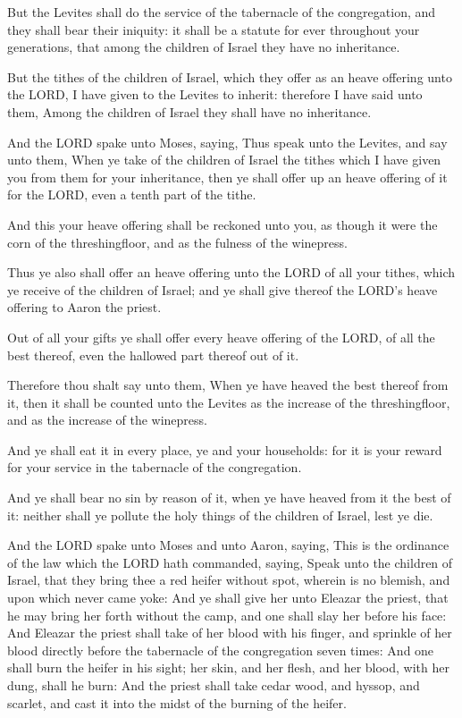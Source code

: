 \Verse But the Levites shall do the service of the tabernacle of the
congregation, and they shall bear their iniquity: it shall be a
statute for ever throughout your generations, that among the children
of Israel they have no inheritance.

\Verse But the tithes of the children of Israel, which they offer as an
heave offering unto the LORD, I have given to the Levites to inherit:
therefore I have said unto them, Among the children of Israel they
shall have no inheritance.

\Verse And the LORD spake unto Moses, saying, \Verse Thus speak unto the
Levites, and say unto them, When ye take of the children of Israel the
tithes which I have given you from them for your inheritance, then ye
shall offer up an heave offering of it for the LORD, even a tenth part
of the tithe.

\Verse And this your heave offering shall be reckoned unto you, as
though it were the corn of the threshingfloor, and as the fulness of
the winepress.

\Verse Thus ye also shall offer an heave offering unto the LORD of all
your tithes, which ye receive of the children of Israel; and ye shall
give thereof the LORD's heave offering to Aaron the priest.

\Verse Out of all your gifts ye shall offer every heave offering of the
LORD, of all the best thereof, even the hallowed part thereof out of
it.

\Verse Therefore thou shalt say unto them, When ye have heaved the best
thereof from it, then it shall be counted unto the Levites as the
increase of the threshingfloor, and as the increase of the winepress.

\Verse And ye shall eat it in every place, ye and your households: for
it is your reward for your service in the tabernacle of the
congregation.

\Verse And ye shall bear no sin by reason of it, when ye have heaved
from it the best of it: neither shall ye pollute the holy things of
the children of Israel, lest ye die.


\Chapter
\Verse And the LORD spake unto Moses and unto Aaron, saying, \Verse This
is the ordinance of the law which the LORD hath commanded, saying,
Speak unto the children of Israel, that they bring thee a red heifer
without spot, wherein is no blemish, and upon which never came yoke:
\Verse And ye shall give her unto Eleazar the priest, that he may bring
her forth without the camp, and one shall slay her before his face:
\Verse And Eleazar the priest shall take of her blood with his finger,
and sprinkle of her blood directly before the tabernacle of the
congregation seven times: \Verse And one shall burn the heifer in his
sight; her skin, and her flesh, and her blood, with her dung, shall he
burn: \Verse And the priest shall take cedar wood, and hyssop, and
scarlet, and cast it into the midst of the burning of the heifer.

